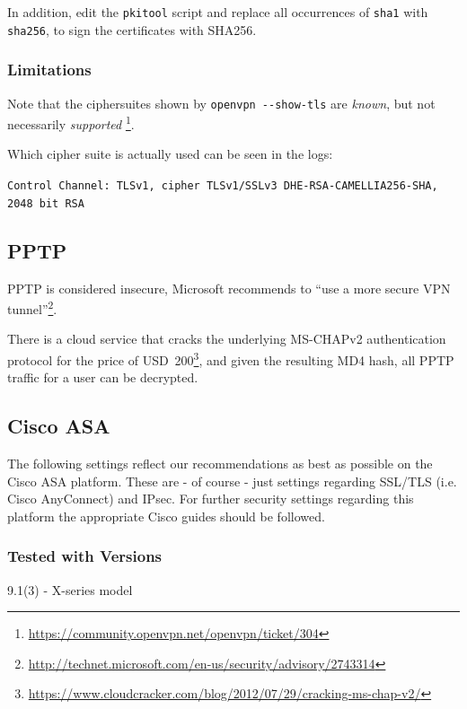 In addition, edit the \verb|pkitool| script and replace all occurrences
of \verb|sha1| with \verb|sha256|, to sign the certificates with
SHA256.

\subsubsection{Limitations}
Note that the ciphersuites shown by \verb|openvpn --show-tls| are \emph{known}, but not necessarily \emph{supported} \footnote{\url{https://community.openvpn.net/openvpn/ticket/304}}.

Which cipher suite is actually used can be seen in the logs:

\verb|Control Channel: TLSv1, cipher TLSv1/SSLv3 DHE-RSA-CAMELLIA256-SHA, 2048 bit RSA|


\subsection{PPTP}

PPTP is considered insecure, Microsoft recommends to ``use a more secure VPN
tunnel''\footnote{\url{http://technet.microsoft.com/en-us/security/advisory/2743314}}.

There is a cloud service that cracks the underlying MS-CHAPv2
authentication protocol for the price of USD~200\footnote{\url{https://www.cloudcracker.com/blog/2012/07/29/cracking-ms-chap-v2/}},
and given the resulting MD4 hash, all PPTP traffic for a user can
be decrypted.

\subsection{Cisco ASA}
The following settings reflect our recommendations as best as possible on the Cisco ASA platform. These are - of course - just settings regarding SSL/TLS (i.e. Cisco AnyConnect) and IPsec. For further security settings regarding this platform the appropriate Cisco guides should be followed.


\subsubsection{Tested with Versions}
\begin{itemize*}
  \item 9.1(3) - X-series model
\end{itemize*}

